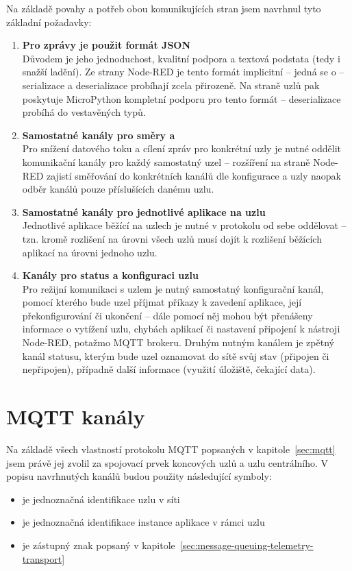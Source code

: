 Na základě povahy a potřeb obou komunikujících stran jsem navrhnul tyto základní požadavky:
\begin{enumerate}
    \item \textbf{Pro zprávy je použit formát JSON} \\
    Důvodem je jeho jednoduchost, kvalitní podpora a textová podstata (tedy i snažší ladění).
    Ze strany Node-RED je tento formát implicitní -- jedná se o  -- serializace a
    deserializace probíhají zcela přirozeně.
    Na straně uzlů pak poskytuje MicroPython kompletní podporu pro tento formát -- deserializace probíhá do
    vestavěných typů.

    \item \textbf{Samostatné kanály pro směry  a } \\
    Pro snížení datového toku a cílení zpráv pro konkrétní uzly je nutné oddělit komunikační kanály pro každý
    samostatný uzel -- rozšíření na straně Node-RED zajistí směřování do konkrétních kanálů dle konfigurace a uzly
    naopak odběr kanálů pouze příslušících danému uzlu.

    \item \textbf{Samostatné kanály pro jednotlivé aplikace na uzlu} \\
    Jednotlivé aplikace běžící na uzlech je nutné v protokolu od sebe oddělovat -- tzn. kromě rozlišení na úrovni
    všech uzlů musí dojít k rozlišení běžících aplikací na úrovni jednoho uzlu.

    \item \textbf{Kanály pro status a konfiguraci uzlu} \\
    Pro režijní komunikaci s uzlem je nutný samostatný konfigurační kanál, pomocí kterého bude uzel příjmat příkazy k
    zavedení aplikace, její překonfigurování či ukončení -- dále pomocí něj mohou být přenášeny informace o vytížení
    uzlu, chybách aplikací či nastavení připojení k nástroji Node-RED, potažmo MQTT brokeru.
    Druhým nutným kanálem je zpětný kanál statusu, kterým bude uzel oznamovat do sítě svůj stav (připojen či
    nepřipojen), případně další informace (využití úložiště, čekající data).
\end{enumerate}

\section{MQTT kanály}\label{sec:mqtt-kanaly}
Na základě všech vlastností protokolu MQTT popsaných v kapitole~\ref{sec:mqtt} jsem právě jej zvolil za spojovací
prvek koncových uzlů a uzlu centrálního.
V popisu navrhnutých kanálů budou použity následující symboly:
\begin{itemize}
    \item {} je jednoznačná identifikace uzlu v síti 
    \item {} je jednoznačná identifikace instance aplikace v rámci uzlu
    \item \ic{\#} je zástupný znak popsaný v kapitole~\ref{sec:message-queuing-telemetry-transport}
\end{itemize}

